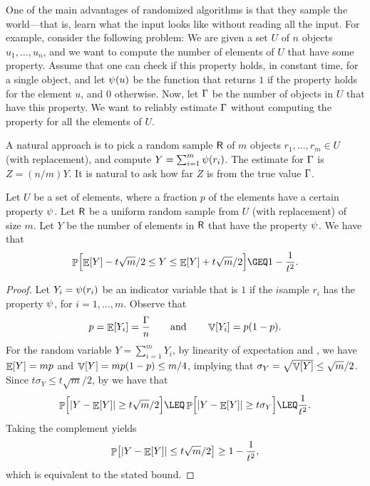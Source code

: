 One of the main advantages of randomized algorithms is that they sample
the world---that is, learn what the input looks like without reading all
the input. For example, consider the following problem: We are given a
set $U$ of $n$ objects $u_1, \ldots, u_n$, and we want to compute the number
of elements of $U$ that have some property. Assume that one can check if
this property holds, in constant time, for a single object, and let
$\propertyX{u}$ be the function that returns $1$ if the property holds
for the element $u$, and $0$ otherwise.  Now, let $\Gamma$ be the number
of objects in $U$ that have this property. We want to reliably estimate
$\Gamma$ without computing the property for all the elements of $U$.

A natural approach is to pick a random sample $\mathsf{R}$ of $m$ objects
$r_1, \ldots, r_m \in U$ (with replacement), and compute
$Y = \sum_{i=1}^m \propertyX{r_i}$.  The estimate for $\Gamma$ is
$Z = (n/m) Y$. It is natural to ask how far $Z$ is from the true value
$\Gamma$.


\begin{lemma}
    Let $U$ be a set of elements, where a fraction $p$ of the elements
    have a certain property $\psi$. Let $\mathsf{R}$ be a uniform
    random sample from $U$ (with replacement) of size $m$. Let $Y$ be the
    number of elements in $\mathsf{R}$ that have the property
    $\psi$. We have that
    \begin{equation*}
        \Prob{ \Bigl. \Ex{Y} - t \sqrt{m}/2 \leq Y \leq \Ex{Y} + t \sqrt{m}/2
        } \GEQ 1- \frac{1}{t^2}.
    \end{equation*}
\end{lemma}
\begin{proof}
    Let $Y_i = \propertyX{r_i}$ be an indicator variable that is $1$ if
    the $i$\th sample $r_i$ has the property $\psi$, for
    $i=1,\ldots, m$.  Observe that
    \begin{equation*}
        p = \mathop{\mathbb{E}}\!\left[ {Y_i} \right] = \frac{\Gamma}{n}
        \qquad\text{and}\qquad
        \mathop{\mathbb{V}}\!\left[ {Y_i} \right] = p(1-p).        
    \end{equation*}
    For the random variable $Y = \sum_{i=1}^m Y_i$, by linearity of
    expectation and , we have $\mathop{\mathbb{E}}\!\left[ {Y} \right] = mp$ and
    $\mathop{\mathbb{V}}\!\left[ {Y} \right] = m p (1-p) \leq m/4$, implying that
    $\sigma_Y = \sqrt{\mathop{\mathbb{V}}\!\left[ {Y} \right]} \leq \sqrt{m}/2$. Since
    $t \sigma_Y \leq t \sqrt{m}/2$, by  we have that
    \begin{equation*}
        \Prob{ \cardin{Y - \Ex{Y}} \geq t \sqrt{m}/2
           \Bigr.
        }
        \LEQ
        \Prob{\Bigl. \cardin{Y - \Ex{Y}} \geq t \sigma_Y}
        \LEQ
        \frac{1}{t^2}.
    \end{equation*}
    Taking the complement yields
    \begin{equation*}
        \Prob{ \cardin{Y - \Ex{Y}} \leq t \sqrt{m}/2 } \geq 1 - \frac{1}{t^2},
    \end{equation*}
    which is equivalent to the stated bound.
\end{proof}

